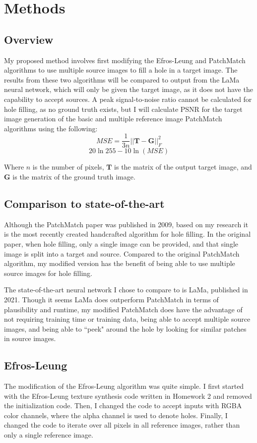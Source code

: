 \section{Methods}
\label{sec:methods}
\subsection*{Overview}
My proposed method involves first modifying the Efros-Leung and PatchMatch algorithms to use multiple source images to fill a hole in a target image. The results from these two algorithms will be compared to output from the LaMa neural network, which will only be given the target image, as it does not have the capability to accept sources. A peak signal-to-noise ratio cannot be calculated for hole filling, as no ground truth exists, but I will calculate PSNR for the target image generation of the basic and multiple reference image PatchMatch algorithms using the following:
$$MSE = \frac1{3n}||\mathbf{T} - \mathbf{G}||_F^2$$
$$20\ln255 - 10\ln(MSE)$$

Where $n$ is the number of pixels, $\mathbf{T}$ is the matrix of the output target image, and $\mathbf{G}$ is the matrix of the ground truth image.

\subsection*{Comparison to state-of-the-art}
Although the PatchMatch paper was published in 2009, based on my research it is the most recently created handcrafted algorithm for hole filling. In the original paper, when hole filling, only a single image can be provided, and that single image is split into a target and source. Compared to the original PatchMatch algorithm, my modified version has the benefit of being able to use multiple source images for hole filling. 

The state-of-the-art neural network I chose to compare to is LaMa, published in 2021. Though it seems LaMa does outperform PatchMatch in terms of plausibility and runtime, my modified PatchMatch does have the advantage of not requiring training time or training data, being able to accept multiple source images, and being able to ``peek" around the hole by looking for similar patches in source images.

\subsection*{Efros-Leung}
The modification of the Efros-Leung algorithm was quite simple. I first started with the Efros-Leung texture synthesis code written in Homework 2 and removed the initialization code. Then, I changed the code to accept inputs with RGBA color channels, where the alpha channel is used to denote holes. Finally, I changed the code to iterate over all pixels in all reference images, rather than only a single reference image.

